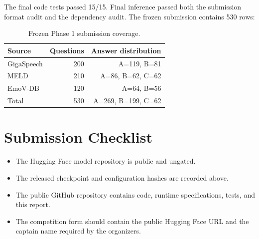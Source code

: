 \documentclass[11pt]{article}
\begin{document}
The final code tests passed 15/15. Final inference passed both the submission
format audit and the dependency audit. The frozen submission contains 530 rows:

\begin{table}[h]
\centering
\small
\begin{tabular}{@{}lrr@{}}
\toprule
Source & Questions & Answer distribution \\
\midrule
GigaSpeech & 200 & A=119, B=81 \\
MELD & 210 & A=86, B=62, C=62 \\
EmoV-DB & 120 & A=64, B=56 \\
\midrule
Total & 530 & A=269, B=199, C=62 \\
\bottomrule
\end{tabular}
\caption{Frozen Phase 1 submission coverage.}
\end{table}

\section{Submission Checklist}

\begin{itemize}
  \item The Hugging Face model repository is public and ungated.
  \item The released checkpoint and configuration hashes are recorded above.
  \item The public GitHub repository contains code, runtime specifications,
  tests, and this report.
  \item The competition form should contain the public Hugging Face URL and
  the captain name required by the organizers.
\end{itemize}
\end{document}
